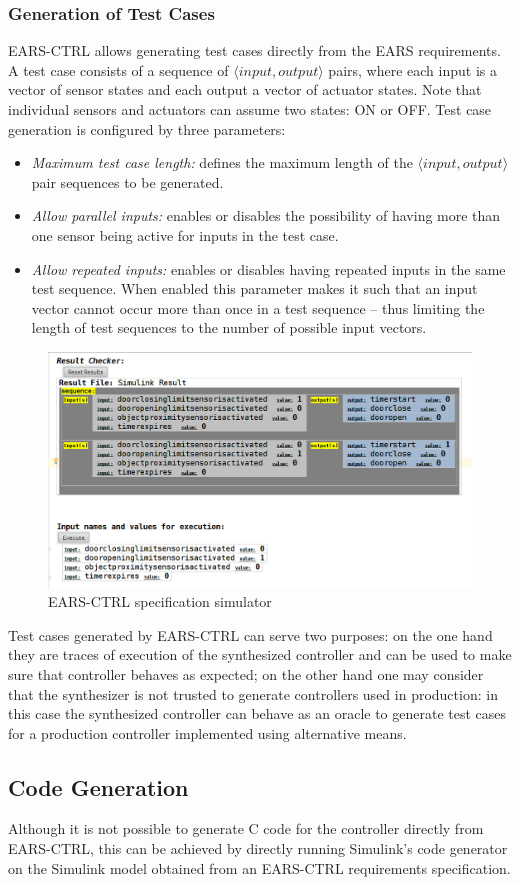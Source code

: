 \subsubsection{Generation of Test Cases}
\textsf{EARS-CTRL} allows generating test cases directly from the EARS
requirements. A test case consists of a sequence of $\langle
input, output \rangle$ pairs, where each input is a vector of sensor states
and each output a vector of actuator states. Note that individual sensors and
actuators can assume two states: \textsf{ON} or \textsf{OFF}. Test case
generation is configured by three parameters:\vspace{-.1cm}
\begin{itemize}
  \item \emph{Maximum test case length:} defines the maximum length of the
  $\langle input, output \rangle$ pair sequences to be generated.
  \item \emph{Allow parallel inputs:} enables or disables the possibility of
  having more than one sensor being active for inputs in the test case.
  \item \emph{Allow repeated inputs:} enables or disables having repeated inputs
  in the same test sequence. When enabled this parameter makes it such that
  an input vector cannot occur more than once in a test sequence -- thus
  limiting the length of test sequences to the number of possible input
  vectors.\vspace{-.7cm}
\end{itemize}
\begin{figure}[h!]
   \begin{center}
     \includegraphics[width=.5\textwidth]{images/simulation.png}
     \caption{\textsf{EARS-CTRL} specification simulator}
     \label{fig:ears_simulator}
   \end{center}
 \end{figure}
\vspace{-1cm}
Test cases generated by \textsf{EARS-CTRL} can serve two purposes: on
the one hand they are traces of execution of the synthesized controller and can
be used to make sure that controller behaves as expected; on the other hand one
may consider that the synthesizer is not trusted to generate controllers used in
production: in this case the synthesized controller can behave as an oracle to
generate test cases for a production controller implemented using alternative
means.\vspace{-.5cm}
\subsection{Code Generation}
\vspace{-.2cm}Although it is not possible to generate C code for the controller
directly from \textsf{EARS-CTRL}, this can be achieved by directly running Simulink's code
generator on the Simulink model obtained from an \textsf{EARS-CTRL} requirements
specification.
